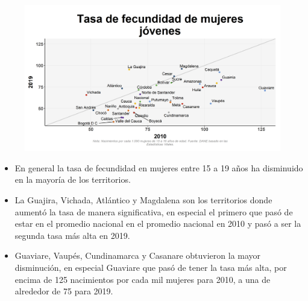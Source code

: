    \begin{figure}[H]
        \caption[Tasa de fecundidad en mujeres jóvenes por departamentos - 2010 VS 2019 ]{\label{fecundjov_dpto_scatter} }
        \begin{center}
        \includegraphics[width=\textwidth,keepaspectratio]{img/var_282_scatter_time.png}
        \end{center}
    \end{figure}
            \begin{itemize}
                \item En general la tasa de fecundidad en mujeres entre 15 a 19 años ha disminuido en la mayoría de los territorios.
                \item La Guajira, Vichada, Atlántico y Magdalena son los territorios donde aumentó la tasa de manera significativa, en especial el primero que pasó de estar en el promedio nacional en el promedio nacional en 2010 y pasó a ser la segunda tasa más alta en 2019.
                \item Guaviare, Vaupés, Cundinamarca y Casanare obtuvieron la mayor disminución, en especial Guaviare que pasó de tener la tasa más alta, por encima de 125 nacimientos por cada mil mujeres para 2010, a una de alrededor de 75 para 2019.
                \end{itemize}


